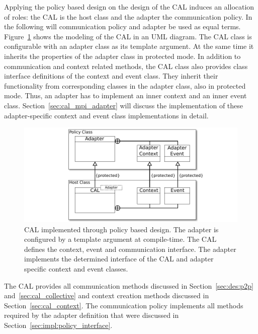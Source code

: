 Applying the policy based design on the design of the CAL induces an
allocation of roles: the CAL is the host class and the adapter the
communication policy. In the following will communication policy and
adapter be used as equal terms.  Figure~\ref{fig:cal_uml} shows the
modeling of the CAL in an UML diagram.  The CAL class is configurable
with an adapter class as its template argument. At the same time it
inherits the properties of the adapter class in protected mode.  In
addition to communication and context related methods, the CAL class
also provides class interface definitions of the context and event
class. They inherit their functionality from corresponding classes in the
adapter class, also in protected mode. Thus, an adapter has to
implement an inner context and an inner event class.
Section~\ref{sec:cal_mpi_adapter} will discuss the implementation of
these adapter-specific context and event class implementations in
detail.

\begin{figure}[H]
  \centering \includegraphics[width=\textwidth]{graphics/40_cal_uml}
  \caption{CAL implemented through policy based design. The adapter is
    configured by a template argument at compile-time. The CAL defines
    the context, event and communication interface. The adapter
    implements the determined interface of the CAL and adapter specific
    context and event classes.}
  \label{fig:cal_uml}
\end{figure}

\noindent The CAL provides all communication methods discussed in
Section~\ref{sec:des:p2p} and~\ref{sec:cal_collective} and context
creation methods discussed in Section~\ref{sec:cal_context}. The
communication policy implements all methods required by the adapter
definition that were discussed in
Section~\ref{sec:impl:policy_interface}.



